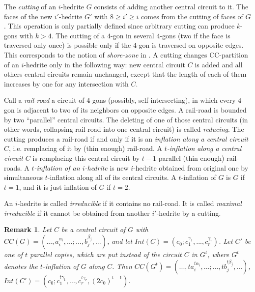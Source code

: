 \documentclass[12pt]{article}
\newtheorem{remark}{Remark}
\begin{document}
The {\em cutting} of an $i$-hedrite $G$ consists of adding another central 
circuit to it. The faces of the new $i'$-hedrite $G'$ with $8\geq i'\geq i$ 
comes from the cutting of faces of $G$. This operation is only partially
defined since arbitrary cutting can produce $k$-gons with $k>4$. The 
cutting of a $4$-gon in several $4$-gons (two if the face
is traversed only once) is possible only if the $4$-gon is traversed 
on opposite edges. This corresponds to the notion of {\it shore-zone} 
in \cite{DSt}.
A cutting changes CC-partition of an $i$-hedrite only in the following 
way: new central circuit $C$ is added and all others central circuits 
remain unchanged, except that the length of each of them increases by one 
for any intersection with $C$. 


Call a {\em rail-road} a circuit of $4$-gons (possibly, self-intersecting), 
in which every $4$-gon is adjacent to two of its neighbors on opposite
edges. A rail-road is bounded by two ``parallel'' central circuits.
The deleting of  one of those central circuits (in other words, collapsing
rail-road into one central circuit) is called {\em reducing}.
The cutting produces a rail-road if and only if it is an {\em inflation 
along a central circuit $C$}, i.e. remplacing of it by (thin enough) 
rail-road. A {\em $t$-inflation along a central circuit $C$} is remplacing
this central circuit by $t-1$ parallel (thin enough) rail-roads.
A {\em $t$-inflation of an $i$-hedrite} is new $i$-hedrite
obtained from original one by simultaneous $t$-inflation along all
of its central circuits. 
A $t$-inflation of $G$ is $G$ if $t=1$, and it is just inflation of $G$ 
if $t=2$.


An $i$-hedrite is called {\em irreducible} if it contains no 
rail-road. It is called {\em maximal irreducible} if it cannot be
obtained from another $i'$-hedrite by a cutting.


\begin{remark}

Let $C$ be a central circuit of $G$ with $CC(G)=(...,a_i^{\alpha_i},...;...,b_j^{\beta_j},...)$,  and let 
$Int(C)=(c_0;c_1^{\gamma_1},...,c_r^{\gamma_r})$. Let $C'$ be one of 
$t$ parallel copies, which are put instead of the circuit $C$ in 
$G^t$, where $G^t$ denotes the $t$-inflation of $G$ along $C$.
Then $CC(G^t)=(...,ta_i^{t\alpha_i},...;...,tb_j^{t\beta_j},...)$,
$Int(C')=(c_0;c_1^{t\gamma_1},...,c_r^{t\gamma_r}, (2c_0)^{t-1})$.
\end{remark}
\end{document}
